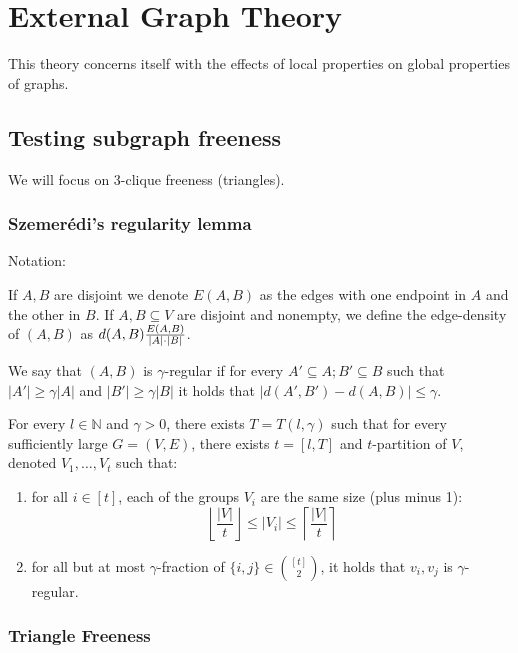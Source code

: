 \documentclass{idc_msc}
\let\defeq\relax
\newcommand\defeq{\stackrel{\mathclap{\normalfont\mbox{def}}}{=}}
\begin{document}
\clearpage
\section{External Graph Theory}

This theory concerns itself with the effects of local properties on global properties of graphs.

\subsection{Testing subgraph freeness}

We will focus on 3-clique freeness (triangles).

\subsubsection{Szemer\'edi's regularity lemma}

Notation:

If \(A, B\) are disjoint we denote \(E(A, B)\) as the edges with one endpoint in \(A\) and the other in \(B\).
If \(A, B \subseteq V\) are disjoint and nonempty, we define the edge-density of \((A, B)\) as \(d(A, B) \defeq \frac{E(A,B)}{|A|\cdot |B|}\).

We say that \((A,B)\) is \(\gamma\)-regular if for every \(A' \subseteq A; B' \subseteq B\) such that \(|A'| \ge \gamma |A|\) and \(|B'| \ge \gamma |B|\) it holds that \(|d(A',B')-d(A,B)| \le \gamma\).


For every \(l \in \mathbb{N}\) and \(\gamma > 0\), there exists \(T = T(l, \gamma)\) such that for every sufficiently large \(G = (V,E)\), there exists \(t = [l, T]\) and \(t\)-partition of \(V\), denoted \(V_1, \ldots, V_t\) such that:

\begin{enumerate}
  \item for all \(i \in [t]\), each of the groups \(V_i\) are the same size (plus minus 1):
  \[
  \left\lfloor \frac{|V|}{t} \right\rfloor \le |V_i| \le \left\lceil \frac{|V|}{t} \right\rceil
  \]

  \item for all but at most \(\gamma\)-fraction of \(\{i,j\} \in \binom{[t]}{2}\), it holds that \(v_i, v_j\) is \(\gamma\)-regular.
\end{enumerate}

\subsubsection{Triangle Freeness}
\end{document}
